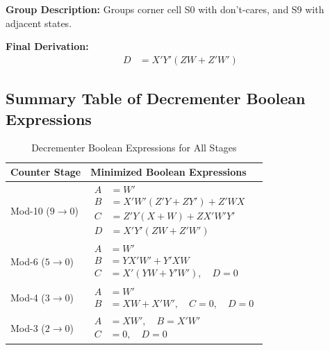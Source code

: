 \documentclass[journal,12pt,onecolumn]{IEEEtran}
\begin{document}
		\begin{justify}
			\textbf{Group Description:} Groups corner cell S0 with don't-cares, and S9 with adjacent states.
			
			\textbf{Final Derivation:}
			\begin{align}
				D &= X'Y'(ZW + Z'W')
			\end{align}
		\end{justify}
		
		\vspace{1em}
		\subsection{Summary Table of Decrementer Boolean Expressions}
		
		\begin{table}[H]
			\centering
			\begin{tabular}{|l|l|}
				\hline
				\textbf{Counter Stage} & \textbf{Minimized Boolean Expressions} \\
				\hline
				Mod-10 ($9 \rightarrow 0$) & 
				$\begin{aligned}
					A &= W' \\
					B &= X'W'(Z'Y + ZY') + Z'WX \\
					C &= Z'Y(X + W) + ZX'W'Y' \\
					D &= X'Y'(ZW + Z'W')
				\end{aligned}$ \\
				\hline
				Mod-6 ($5 \rightarrow 0$) & 
				$\begin{aligned}
					A &= W' \\
					B &= YX'W' + Y'XW \\
					C &= X'(YW + Y'W'), \quad D = 0
				\end{aligned}$ \\
				\hline
				Mod-4 ($3 \rightarrow 0$) & 
				$\begin{aligned}
					A &= W' \\
					B &= XW + X'W', \quad C = 0, \quad D = 0
				\end{aligned}$ \\
				\hline
				Mod-3 ($2 \rightarrow 0$) & 
				$\begin{aligned}
					A &= XW', \quad B = X'W' \\
					C &= 0, \quad D = 0
				\end{aligned}$ \\
				\hline
			\end{tabular}
			\caption{Decrementer Boolean Expressions for All Stages}
		\end{table}
		
\end{document}
